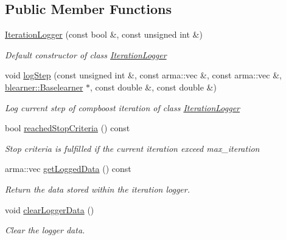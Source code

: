\subsection*{Public Member Functions}
\begin{DoxyCompactItemize}
\item 
\mbox{\hyperlink{classlogger_1_1_iteration_logger_a571269a473e45ed773685092fab123c6}{Iteration\+Logger}} (const bool \&, const unsigned int \&)
\begin{DoxyCompactList}\small\item\em Default constructor of class {\ttfamily \mbox{\hyperlink{classlogger_1_1_iteration_logger}{Iteration\+Logger}}} \end{DoxyCompactList}\item 
void \mbox{\hyperlink{classlogger_1_1_iteration_logger_a36437ff3a6e6a617f6d2107eab9fba7a}{log\+Step}} (const unsigned int \&, const arma\+::vec \&, const arma\+::vec \&, \mbox{\hyperlink{classblearner_1_1_baselearner}{blearner\+::\+Baselearner}} $\ast$, const double \&, const double \&)
\begin{DoxyCompactList}\small\item\em Log current step of compboost iteration of class {\ttfamily \mbox{\hyperlink{classlogger_1_1_iteration_logger}{Iteration\+Logger}}} \end{DoxyCompactList}\item 
bool \mbox{\hyperlink{classlogger_1_1_iteration_logger_a8b66f0d8d2ddb7f15ca14e2b9150ea80}{reached\+Stop\+Criteria}} () const
\begin{DoxyCompactList}\small\item\em Stop criteria is fulfilled if the current iteration exceed {\ttfamily max\+\_\+iteration} \end{DoxyCompactList}\item 
arma\+::vec \mbox{\hyperlink{classlogger_1_1_iteration_logger_ab073ed2a2806372ec823aa495112cf24}{get\+Logged\+Data}} () const
\begin{DoxyCompactList}\small\item\em Return the data stored within the iteration logger. \end{DoxyCompactList}\item 
void \mbox{\hyperlink{classlogger_1_1_iteration_logger_a7439c16a1482ad8c09f8ab37baf45690}{clear\+Logger\+Data}} ()
\begin{DoxyCompactList}\small\item\em Clear the logger data. \end{DoxyCompactList}\item 

\end{DoxyCompactItemize}
